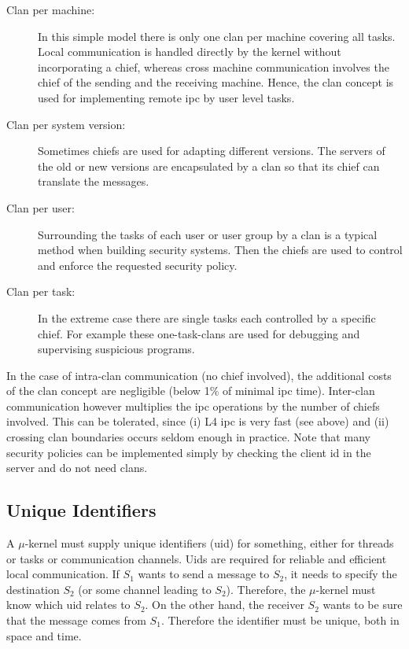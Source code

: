 \documentclass[a4paper,11pt,twoside,dvips]{book}
\newcommand{\micro}{$\mu$}
\begin{document}
\begin{description} 
 
\item[Clan per machine:] 
     In this simple model there is only one clan per machine covering all
     tasks. Local communication is handled directly by the kernel without
     incorporating a chief, whereas cross machine communication involves the
     chief of the sending and the receiving machine. Hence, the clan
     concept is used for implementing remote ipc by user level tasks. 
 
\item[Clan per system version:] 
     Sometimes chiefs are used for adapting different versions. The servers
     of the old or new versions are encapsulated by a clan so that its
     chief can translate the messages. 
 
\item[Clan per user:] 
     Surrounding the tasks of each user or user group by a clan is a typical
     method when building security systems. Then the chiefs are used to
     control and enforce the requested security policy. 
 
\item[Clan per task:] 
     In the extreme case there are single tasks each controlled by a
     specific chief. For example these one-task-clans are used for debugging
     and supervising suspicious programs.
 
\end{description} 
 
In the case of intra-clan communication (no chief involved),
the additional costs of the clan concept are
negligible (below 1\% of minimal ipc time). Inter-clan communication
however multiplies the ipc operations by the number of chiefs involved. This
can be tolerated, since (i) L4 ipc is very fast (see above) and (ii) crossing
clan boundaries occurs seldom enough in practice. Note that many security
policies can be implemented simply by checking the client id in the server
and do not need clans. 
 
 
 
\subsection{Unique Identifiers} 
 
A \micro-kernel must supply unique identifiers (uid) for something, either
for threads or tasks or communication channels. Uids are required for
reliable and efficient local communication. If $S_1$ wants to send a message
to $S_2$, it needs to specify the destination $S_2$ (or some channel
leading to $S_2$). Therefore, the \micro-kernel must know which uid
relates to $S_2$. On the other hand, the receiver $S_2$ wants to be sure
that the message comes from $S_1$. Therefore the identifier must be unique,
both in space and time. 
 
\end{document}
